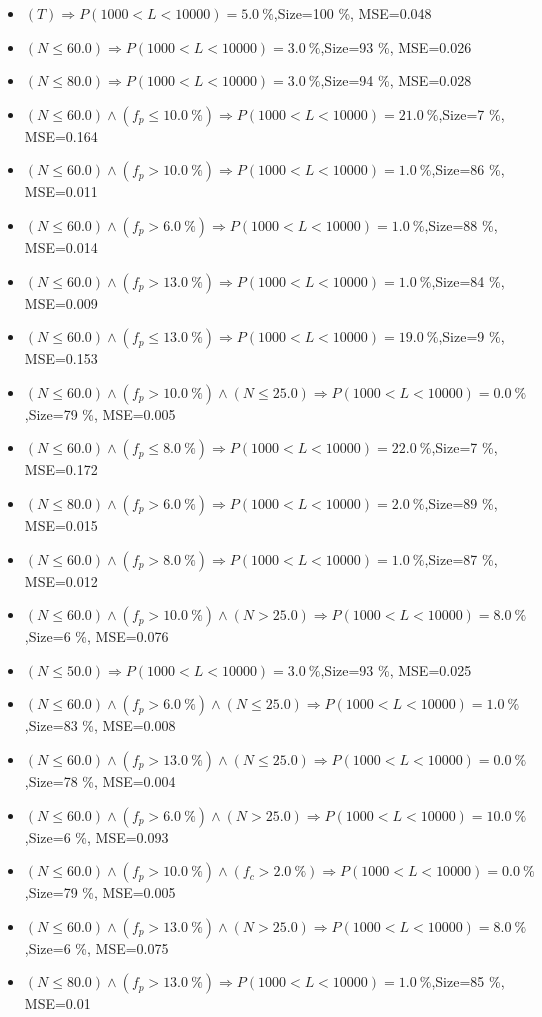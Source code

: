 \documentclass[numbered]{CSL}
\begin{document}
\begin{itemize}
\item $(T) \Rightarrow P(1 000 < L < 10 000) = 5.0~\%$,\hfill Size=100 \%, MSE=0.048
\item $(N \leq 60.0) \Rightarrow P(1 000 < L < 10 000) = 3.0~\%$,\hfill Size=93 \%, MSE=0.026
\item $(N \leq 80.0) \Rightarrow P(1 000 < L < 10 000) = 3.0~\%$,\hfill Size=94 \%, MSE=0.028
\item $(N \leq 60.0) \land (f_p \leq 10.0~\%) \Rightarrow P(1 000 < L < 10 000) = 21.0~\%$,\hfill Size=7 \%, MSE=0.164
\item $(N \leq 60.0) \land (f_p > 10.0~\%) \Rightarrow P(1 000 < L < 10 000) = 1.0~\%$,\hfill Size=86 \%, MSE=0.011
\item $(N \leq 60.0) \land (f_p > 6.0~\%) \Rightarrow P(1 000 < L < 10 000) = 1.0~\%$,\hfill Size=88 \%, MSE=0.014
\item $(N \leq 60.0) \land (f_p > 13.0~\%) \Rightarrow P(1 000 < L < 10 000) = 1.0~\%$,\hfill Size=84 \%, MSE=0.009
\item $(N \leq 60.0) \land (f_p \leq 13.0~\%) \Rightarrow P(1 000 < L < 10 000) = 19.0~\%$,\hfill Size=9 \%, MSE=0.153
\item $(N \leq 60.0) \land (f_p > 10.0~\%) \land (N \leq 25.0) \Rightarrow P(1 000 < L < 10 000) = 0.0~\%$,\hfill Size=79 \%, MSE=0.005
\item $(N \leq 60.0) \land (f_p \leq 8.0~\%) \Rightarrow P(1 000 < L < 10 000) = 22.0~\%$,\hfill Size=7 \%, MSE=0.172
\item $(N \leq 80.0) \land (f_p > 6.0~\%) \Rightarrow P(1 000 < L < 10 000) = 2.0~\%$,\hfill Size=89 \%, MSE=0.015
\item $(N \leq 60.0) \land (f_p > 8.0~\%) \Rightarrow P(1 000 < L < 10 000) = 1.0~\%$,\hfill Size=87 \%, MSE=0.012
\item $(N \leq 60.0) \land (f_p > 10.0~\%) \land (N > 25.0) \Rightarrow P(1 000 < L < 10 000) = 8.0~\%$,\hfill Size=6 \%, MSE=0.076
\item $(N \leq 50.0) \Rightarrow P(1 000 < L < 10 000) = 3.0~\%$,\hfill Size=93 \%, MSE=0.025
\item $(N \leq 60.0) \land (f_p > 6.0~\%) \land (N \leq 25.0) \Rightarrow P(1 000 < L < 10 000) = 1.0~\%$,\hfill Size=83 \%, MSE=0.008
\item $(N \leq 60.0) \land (f_p > 13.0~\%) \land (N \leq 25.0) \Rightarrow P(1 000 < L < 10 000) = 0.0~\%$,\hfill Size=78 \%, MSE=0.004
\item $(N \leq 60.0) \land (f_p > 6.0~\%) \land (N > 25.0) \Rightarrow P(1 000 < L < 10 000) = 10.0~\%$,\hfill Size=6 \%, MSE=0.093
\item $(N \leq 60.0) \land (f_p > 10.0~\%) \land (f_c > 2.0~\%) \Rightarrow P(1 000 < L < 10 000) = 0.0~\%$,\hfill Size=79 \%, MSE=0.005
\item $(N \leq 60.0) \land (f_p > 13.0~\%) \land (N > 25.0) \Rightarrow P(1 000 < L < 10 000) = 8.0~\%$,\hfill Size=6 \%, MSE=0.075
\item $(N \leq 80.0) \land (f_p > 13.0~\%) \Rightarrow P(1 000 < L < 10 000) = 1.0~\%$,\hfill Size=85 \%, MSE=0.01
\end{itemize}
\end{document}
